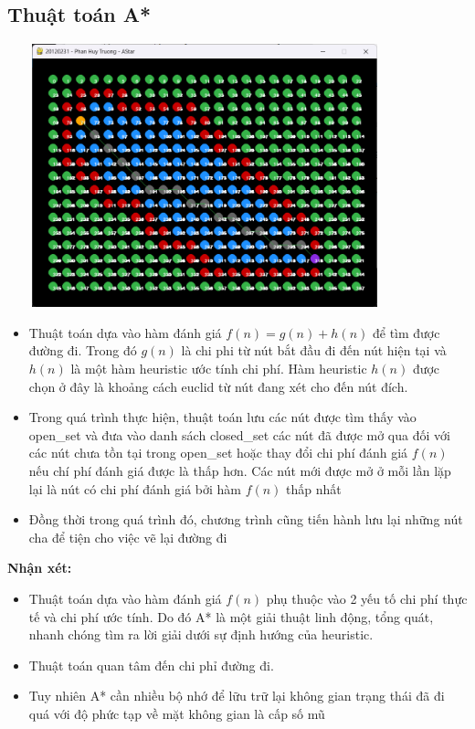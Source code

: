 \documentclass{article}
\begin{document}
\subsection{Thuật toán A*}
    \centerline{\includegraphics[width=4.5in, height=3in]{image/astar_stimulation.png}}
    \vspace{2\baselineskip}
    \begin{itemize}
        \item Thuật toán dựa vào hàm đánh giá $f(n) = g(n) + h(n)$ để tìm được đường đi. Trong đó $g(n)$ là chi phi từ nút bắt đầu đi đến nút hiện tại và $h(n)$ là một hàm heuristic ước tính chi phí. Hàm heuristic $h(n)$ được chọn ở đây là khoảng cách euclid từ nút đang xét cho đến nút đích. 
        \item Trong quá trình thực hiện, thuật toán lưu các nút được tìm thấy vào open\_set và đưa vào danh sách closed\_set các nút đã được mở qua đối với các nút chưa tồn tại trong open\_set hoặc thay đổi chi phí đánh giá $f(n)$ nếu chí phí đánh giá được là thấp hơn. Các nút mới được mở ở mỗi lần lặp lại là nút có chi phí đánh giá bởi hàm $f(n)$ thấp nhất
        \item Đồng thời trong quá trình đó, chương trình cũng tiến hành lưu lại những nút cha để tiện cho việc vẽ lại đường đi
    \end{itemize}
    \textbf{Nhận xét: }
    \begin{itemize}
        \item Thuật toán dựa vào hàm đánh giá $f(n)$ phụ thuộc vào 2 yếu tố chi phí thực tế và chi phí ước tính. Do đó A* là một giải thuật linh động, tổng quát, nhanh chóng tìm ra lời giải dưới sự định hướng của heuristic. 
        \item Thuật toán quan tâm đến chi phỉ đường đi.
        \item Tuy nhiên A* cần nhiều bộ nhớ để lữu trữ lại không gian trạng thái đã đi quá với độ phức tạp về mặt không gian là cấp số mũ
    \end{itemize}
\end{document}
